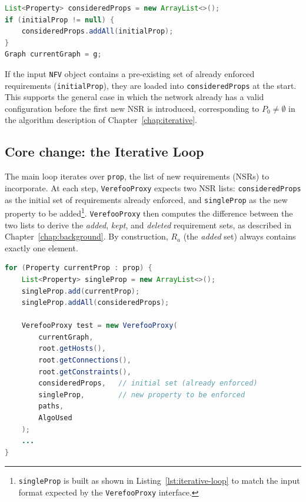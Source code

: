 \begin{lstlisting}[language=Java, caption={Initialization of the iterative state.}, label={lst:iterative-state-init}]
List<Property> consideredProps = new ArrayList<>();
if (initialProp != null) {
    consideredProps.addAll(initialProp);
}
Graph currentGraph = g;
\end{lstlisting}

If the input \texttt{NFV} object contains a pre-existing set of already enforced requirements (\texttt{initialProp}), they are loaded into \texttt{consideredProps} at the start. This supports the general case in which the network already has a valid configuration before the first new NSR is introduced, corresponding to $P_0 \neq \emptyset$ in the algorithm description of Chapter~\ref{chap:iterative}.

\subsection{Core change:  the Iterative Loop}
\label{sec:iterative-loop}

The main loop iterates over \texttt{prop}, the list of new requirements (NSRs) to incorporate. At each step, \texttt{VerefooProxy} expects two NSR lists: \texttt{consideredProps} as the initial set of requirements already enforced, and \texttt{singleProp} as the new property to be added\footnote{\texttt{singleProp} is built as shown in Listing~\ref{lst:iterative-loop} to match the input format expected by the \texttt{VerefooProxy} interface.}. \texttt{VerefooProxy} then computes the difference between the two lists to derive the \textit{added}, \textit{kept}, and \textit{deleted} requirement sets, as described in Chapter~\ref{chap:background}. By construction, $R_a$ (the \textit{added} set) always contains exactly one element.

\begin{lstlisting}[language=Java, caption={Core of the iterative loop.}, label={lst:iterative-loop}]
for (Property currentProp : prop) {
    List<Property> singleProp = new ArrayList<>();
    singleProp.add(currentProp);
    singleProp.addAll(consideredProps);

    VerefooProxy test = new VerefooProxy(
        currentGraph,
        root.getHosts(),
        root.getConnections(),
        root.getConstraints(),
        consideredProps,   // initial set (already enforced)
        singleProp,        // new property to be enforced
        paths,
        AlgoUsed
    );
    ...
}
\end{lstlisting}


